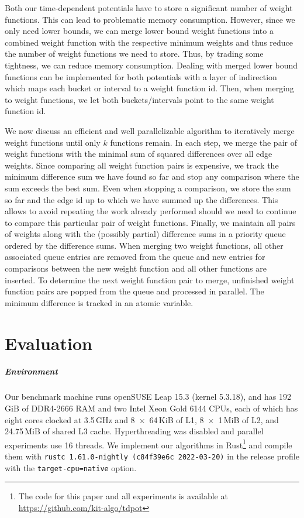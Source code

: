 \documentclass[a4paper,UKenglish,cleveref, autoref, thm-restate,anonymous]{lipics-v2021}
\begin{document}
Both our time-dependent potentials have to store a significant number of weight functions.
This can lead to problematic memory consumption.
However, since we only need lower bounds, we can merge lower bound weight functions into a combined weight function with the respective minimum weights and thus reduce the number of weight functions we need to store.
Thus, by trading some tightness, we can reduce memory consumption.
Dealing with merged lower bound functions can be implemented for both potentials with a layer of indirection which maps each bucket or interval to a weight function id.
Then, when merging to weight functions, we let both buckets/intervals point to the same weight function id.

We now discuss an efficient and well parallelizable algorithm to iteratively merge weight functions until only $k$ functions remain.
In each step, we merge the pair of weight functions with the minimal sum of squared differences over all edge weights.
Since comparing all weight function pairs is expensive, we track the minimum difference sum we have found so far and stop any comparison where the sum exceeds the best sum.
Even when stopping a comparison, we store the sum so far and the edge id up to which we have summed up the differences.
This allows to avoid repeating the work already performed should we need to continue to compare this particular pair of weight functions.
Finally, we maintain all pairs of weights along with the (possibly partial) difference sums in a priority queue ordered by the difference sums.
When merging two weight functions, all other associated queue entries are removed from the queue and new entries for comparisons between the new weight function and all other functions are inserted.
To determine the next weight function pair to merge, unfinished weight function pairs are popped from the queue and processed in parallel.
The minimum difference is tracked in an atomic variable.

\section{Evaluation}
\subparagraph{Environment} Our benchmark machine runs openSUSE Leap 15.3 (kernel 5.3.18), and has 192\,GiB of DDR4-2666 RAM and two Intel Xeon Gold 6144 CPUs, each of which has eight cores clocked at 3.5\,GHz and 8~$\times$~64\,KiB of L1, 8~$\times$~1\,MiB of L2, and 24.75\,MiB of shared L3 cache.
Hyperthreading was disabled and parallel experiments use 16 threads.
We implement our algorithms in Rust\footnote{The code for this paper and all experiments is available at \url{https://github.com/kit-algo/tdpot}} and compile them with \texttt{rustc 1.61.0-nightly (c84f39e6c 2022-03-20)} in the release profile with the \texttt{target-cpu=native} option.
\end{document}
